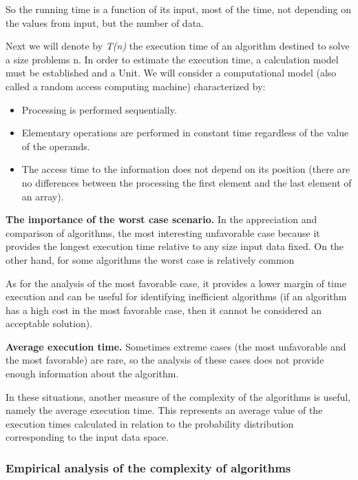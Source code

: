 \documentclass[a4paper, 12pt]{article}
\begin{document}
So the running time is a function of its input, most of the time, not depending on the values from
input, but the number of data.

Next we will denote by \textit{T(n)} the execution time of an algorithm destined to solve a
size problems n. In order to estimate the execution time, a calculation model must be established and a
Unit. We will consider a computational model (also called a random access computing machine)
characterized by:

\begin{itemize}
  \item Processing is performed sequentially.
  \item Elementary operations are performed in constant time regardless of the value of the operands.
  \item The access time to the information does not depend on its position (there are no differences between the processing
  the first element and the last element of an array).
\end{itemize}

\textbf{The importance of the worst case scenario.} In the appreciation and comparison of algorithms, the most interesting
unfavorable case because it provides the longest execution time relative to any size input data
fixed. On the other hand, for some algorithms the worst case is relatively common

As for the analysis of the most favorable case, it provides a lower margin of time
execution and can be useful for identifying inefficient algorithms (if an algorithm has a high cost in the most
favorable case, then it cannot be considered an acceptable solution).

\textbf{Average execution time.} Sometimes extreme cases (the most unfavorable and the most favorable) are rare,
so the analysis of these cases does not provide enough information about the algorithm.

In these situations, another measure of the complexity of the algorithms is useful, namely the average execution time.
This represents an average value of the execution times calculated in relation to the probability distribution
corresponding to the input data space.

\newpage

\subsubsection{Empirical analysis of the complexity of algorithms}
\end{document}
